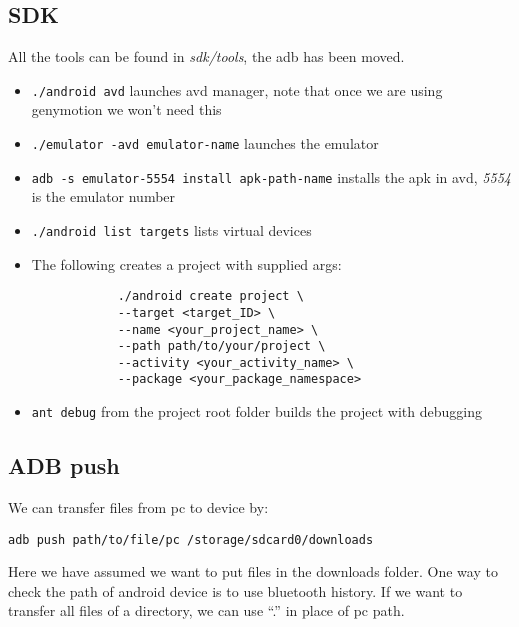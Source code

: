 \documentclass[a4paper, 12pt]{article}
\begin{document}
\subsection{SDK}
All the tools can be found in \emph{sdk/tools}, the adb has been moved.
\begin{itemize}
	\item \verb|./android avd| launches avd manager, note that once we are using genymotion we won't need this
	\item \verb|./emulator -avd emulator-name| launches the emulator
	\item \verb|adb -s emulator-5554 install apk-path-name| installs the apk in avd, \emph{5554} is the emulator number
	\item \verb|./android list targets| lists virtual devices
	\item The following creates a project with supplied args:
		\begin{verbatim}
			./android create project \
			--target <target_ID> \
			--name <your_project_name> \
			--path path/to/your/project \
			--activity <your_activity_name> \
			--package <your_package_namespace>
		\end{verbatim}
	\item \verb|ant debug| from the project root folder builds the project with debugging
\end{itemize}
\subsection{ADB push}
We can transfer files from pc to device by:
\begin{verbatim}
adb push path/to/file/pc /storage/sdcard0/downloads
\end{verbatim}
Here we have assumed we want to put files in the downloads folder.
One way to check the path of android device is to use bluetooth history.
If we want to transfer all files of a directory, we can use ``.'' in place of pc path.
\end{document}
